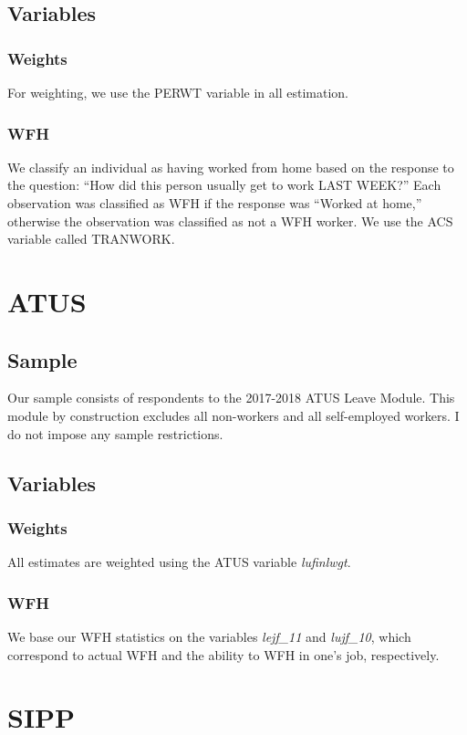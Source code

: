 \documentclass{article}
\begin{document}
\subsection{Variables}
\subsubsection{Weights}
For weighting, we use the PERWT variable in all estimation.

\subsubsection{WFH}
We classify an individual as having worked from home based on the response to the question: ``How did this person usually get to work LAST WEEK?''
Each observation was classified as WFH if the response was ``Worked at home,'' otherwise the observation was classified as not a WFH worker.
We use the ACS variable called TRANWORK.

\section{ATUS}

\subsection{Sample}
Our sample consists of respondents to the 2017-2018 ATUS Leave Module. This module by construction excludes all non-workers and all self-employed workers. I do not impose any sample restrictions.

\subsection{Variables}

\subsubsection{Weights}
All estimates are weighted using the ATUS variable \emph{lufinlwgt}.

\subsubsection{WFH}
We base our WFH statistics on the variables \emph{lejf\_11} and \emph{lujf\_10}, which correspond to actual WFH and the ability to WFH in one's job, respectively.

\section{SIPP}
\end{document}
